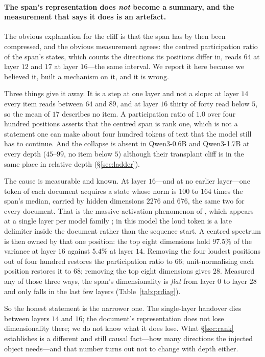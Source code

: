 \documentclass{article}
\begin{document}
\paragraph{The span's representation does \emph{not} become a summary, and the
measurement that says it does is an artefact.} The obvious explanation for the
cliff is that the span has by then been compressed, and the obvious measurement
agrees: the centred participation ratio of the span's states, which counts the
directions its positions differ in, reads $64$ at layer $12$ and $17$ at layer
$16$---the same interval. We report it here because we believed it, built a
mechanism on it, and it is wrong.

Three things give it away. It is a step at one layer and not a slope: at layer
$14$ every item reads between $64$ and $89$, and at layer $16$ thirty of forty
read below $5$, so the mean of $17$ describes no item. A participation ratio of
$1.0$ over four hundred positions asserts that the centred span is rank one,
which is not a statement one can make about four hundred tokens of text that
the model still has to continue. And the collapse is absent in Qwen3-0.6B and
Qwen3-1.7B at every depth ($45$--$99$, no item below $5$) although their
transplant cliff is in the same place in relative depth
(\S\ref{sec:ladder}).

The cause is measurable and known. At layer $16$---and at no earlier layer---one
token of each document acquires a state whose norm is $100$ to $164$ times the
span's median, carried by hidden dimensions $2276$ and $676$, the same two for
every document. That is the massive-activation phenomenon of
\citet{sun2024massive}, which appears at a single layer per model family
\citep{shi2026melayer}; in this model the loud token is a late delimiter inside
the document rather than the sequence start. A centred spectrum is then owned by
that one position: the top eight dimensions hold $97.5\%$ of the variance at
layer $16$ against $5.4\%$ at layer $14$. Removing the four loudest positions
out of four hundred restores the participation ratio to $66$; unit-normalising
each position restores it to $68$; removing the top eight dimensions gives $28$.
Measured any of those three ways, the span's dimensionality is
\emph{flat} from layer $0$ to layer $28$ and only falls in the last few layers
(Table~\ref{tab:prdiag}).

So the honest statement is the narrower one. The single-layer handover dies
between layers $14$ and $16$; the document's representation does not lose
dimensionality there; we do not know what it does lose. What \S\ref{sec:rank}
establishes is a different and still causal fact---how many directions the
injected object needs---and that number turns out not to change with depth
either.
\end{document}
